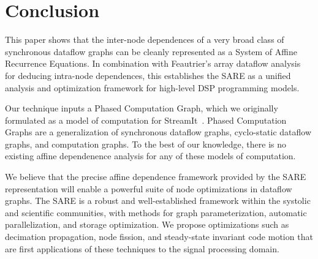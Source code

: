 \section{Conclusion}

This paper shows that the inter-node dependences of a very broad class
of synchronous dataflow graphs can be cleanly represented as a System
of Affine Recurrence Equations.  In combination with Feautrier's array
dataflow analysis~\cite{Feautrier01} for deducing intra-node
dependences, this establishes the SARE as a unified analysis and
optimization framework for high-level DSP programming models.

Our technique inputs a Phased Computation Graph, which we originally
formulated as a model of computation for StreamIt~\cite{streamitcc}.
Phased Computation Graphs are a generalization of synchronous dataflow
graphs, cyclo-static dataflow graphs, and computation graphs.  To the
best of our knowledge, there is no existing affine dependenence
analysis for any of these models of computation.

We believe that the precise affine dependence framework provided by
the SARE representation will enable a powerful suite of node
optimizations in dataflow graphs.  The SARE is a robust and
well-established framework within the systolic and scientific
communities, with methods for graph parameterization, automatic
parallelization, and storage optimization.  We propose optimizations
such as decimation propagation, node fission, and steady-state
invariant code motion that are first applications of these techniques
to the signal processing domain.
